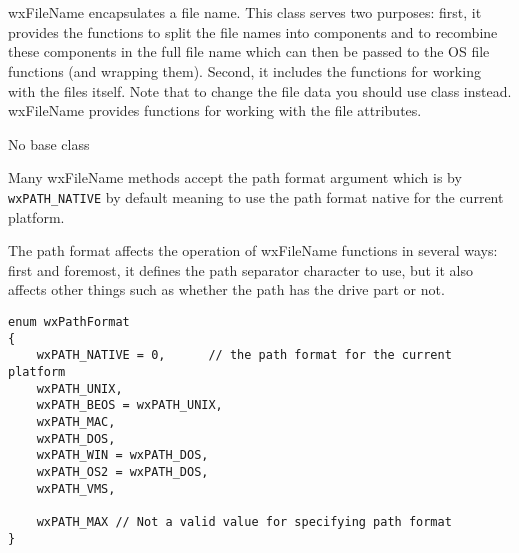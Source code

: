 
\section{}\label{wxfilename}

wxFileName encapsulates a file name. This class serves two purposes: first, it
provides the functions to split the file names into components and to recombine
these components in the full file name which can then be passed to the OS file
functions (and  wrapping them).
Second, it includes the functions for working with the files itself. Note that
to change the file data you should use  class instead.
wxFileName provides functions for working with the file attributes.


No base class


Many wxFileName methods accept the path format argument which is by\rtfsp
{\tt wxPATH\_NATIVE} by default meaning to use the path format native for the
current platform.

The path format affects the operation of wxFileName functions in several ways:
first and foremost, it defines the path separator character to use, but it also
affects other things such as whether the path has the drive part or not.

\begin{verbatim}
enum wxPathFormat
{
    wxPATH_NATIVE = 0,      // the path format for the current platform
    wxPATH_UNIX,
    wxPATH_BEOS = wxPATH_UNIX,
    wxPATH_MAC,
    wxPATH_DOS,
    wxPATH_WIN = wxPATH_DOS,
    wxPATH_OS2 = wxPATH_DOS,
    wxPATH_VMS,

    wxPATH_MAX // Not a valid value for specifying path format
}
\end{verbatim}



